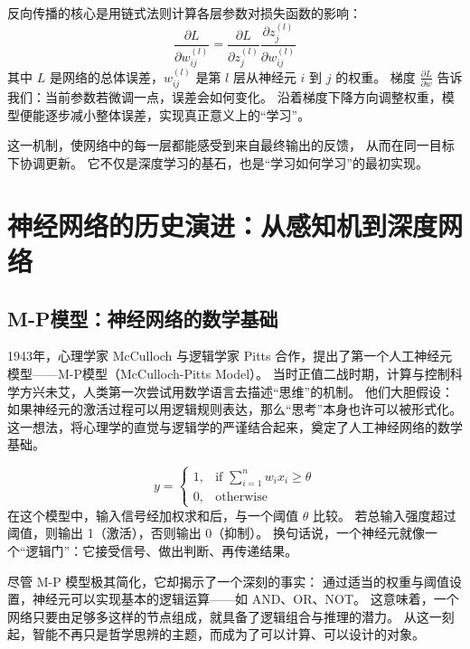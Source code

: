 反向传播的核心是用链式法则计算各层参数对损失函数的影响：  
\begin{equation}
\frac{\partial L}{\partial w_{ij}^{(l)}} = \frac{\partial L}{\partial z_j^{(l)}} \frac{\partial z_j^{(l)}}{\partial w_{ij}^{(l)}}
\end{equation}
其中 $L$ 是网络的总体误差，$w_{ij}^{(l)}$ 是第 $l$ 层从神经元 $i$ 到 $j$ 的权重。  
梯度 $\frac{\partial L}{\partial w}$ 告诉我们：当前参数若微调一点，误差会如何变化。  
沿着梯度下降方向调整权重，模型便能逐步减小整体误差，实现真正意义上的“学习”。  

这一机制，使网络中的每一层都能感受到来自最终输出的反馈，  
从而在同一目标下协调更新。  
它不仅是深度学习的基石，也是“学习如何学习”的最初实现。

\section{神经网络的历史演进：从感知机到深度网络}

\subsection{M-P模型：神经网络的数学基础}

1943年，心理学家 McCulloch 与逻辑学家 Pitts 合作，提出了第一个人工神经元模型——M-P模型（McCulloch-Pitts Model）。  
当时正值二战时期，计算与控制科学方兴未艾，人类第一次尝试用数学语言去描述“思维”的机制。  
他们大胆假设：如果神经元的激活过程可以用逻辑规则表达，那么“思考”本身也许可以被形式化。  
这一想法，将心理学的直觉与逻辑学的严谨结合起来，奠定了人工神经网络的数学基础。

\begin{equation}
y = 
\begin{cases}
1, & \text{if } \sum_{i=1}^{n} w_i x_i \geq \theta \\
0, & \text{otherwise}
\end{cases}
\end{equation}
在这个模型中，输入信号经加权求和后，与一个阈值 $\theta$ 比较。  
若总输入强度超过阈值，则输出 1（激活），否则输出 0（抑制）。  
换句话说，一个神经元就像一个“逻辑门”：它接受信号、做出判断、再传递结果。

尽管 M-P 模型极其简化，它却揭示了一个深刻的事实：  
通过适当的权重与阈值设置，神经元可以实现基本的逻辑运算——如 AND、OR、NOT。  
这意味着，一个网络只要由足够多这样的节点组成，就具备了逻辑组合与推理的潜力。  
从这一刻起，智能不再只是哲学思辨的主题，而成为了可以计算、可以设计的对象。


